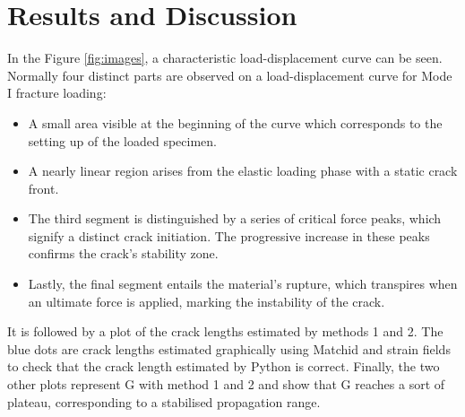 \documentclass[3p,times,procedia]{elsarticle}
\begin{document}
\section{Results and Discussion}\label{S:res}


In the Figure \ref{fig:images}, a characteristic load-displacement curve can be seen. Normally four distinct parts are observed on a load-displacement curve for Mode I fracture loading:

\begin{itemize}
	\item A small area visible at the beginning of the curve which corresponds to the setting up of the loaded specimen. 
	\item A nearly linear region arises from the elastic loading phase with a static crack front.
	\item The third segment is distinguished by a series of critical force peaks, which signify a distinct crack initiation. The progressive increase in these peaks confirms the crack's stability zone.
	\item Lastly, the final segment entails the material's rupture, which transpires when an ultimate force is applied, marking the instability of the crack.
\end{itemize}

It is followed by a plot of the crack lengths estimated by methods 1 and 2. The blue dots are crack lengths estimated graphically using Matchid and strain fields to check that the crack length estimated by Python is correct. Finally, the two other plots represent G with method 1 and 2 and show that G reaches a sort of plateau, corresponding to a stabilised propagation range.
\end{document}
